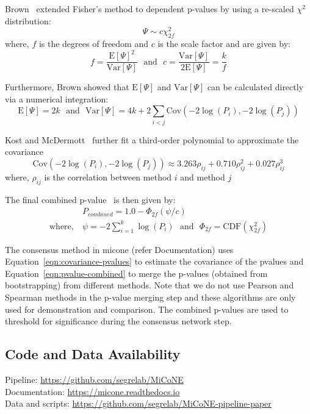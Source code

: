   Brown~\cite{brown_400_1975} extended Fisher's method to dependent p-values by using a re-scaled $\chi^2$ distribution:
  \begin{equation*}
    \Psi \sim c \chi^2_{2f}
  \end{equation*}
  where, $f$ is the degrees of freedom and $c$ is the scale factor and are given by:
  \begin{equation*}
    f = \frac{\mathrm{E}[\Psi]^2}{\mathrm{Var}[\Psi]} ~~~\text{and}~~~ c = \frac{\mathrm{Var}[\Psi]}{2\mathrm{E}[\Psi]} = \frac{k}{f}
  \end{equation*}

  Furthermore, Brown showed that $\mathrm{E}[\Psi]$ and $\mathrm{Var}[\Psi]$ can be calculated directly via a numerical integration:
  \begin{equation*}
    \mathrm{E}[\Psi] = 2k ~~~\text{and}~~~ \mathrm{Var}[\Psi] = 4k + 2\sum_{i<j} \mathrm{Cov}\left( -2\log(P_i), -2\log(P_j) \right)
  \end{equation*}

  Kost and McDermott~\cite{kost_combining_2002} further fit a third-order polynomial to approximate the covariance
  \begin{equation}
    \mathrm{Cov}\left( -2\log(P_i), -2\log(P_j) \right) \approx 3.263 \rho_{ij} + 0.710 \rho_{ij}^2 + 0.027 \rho_{ij}^3
    \label{eqn:covariance-pvalues}
  \end{equation}
  where, $\rho_{ij}$ is the correlation between method $i$ and method $j$

  The final combined p-value~\cite{Poole_Gibbs_Shmulevich_Bernard_Knijnenburg_2016} is then given by:
  \begin{equation}
    \begin{aligned}
        & P_{combined} = 1.0 - \Phi_{2f}\left( \psi / c \right) \\
        \text{where},~ &\psi = -2 \sum_{i=1}^k \log(P_i) ~~~\text{and}~~~ \Phi_{2f} = \mathrm{CDF}\left( \chi^2_{2f} \right)
    \end{aligned}
    \label{eqn:pvalue-combined}
  \end{equation}

  The consensus method in \ac{micone} (refer Documentation) uses Equation~\ref{eqn:covariance-pvalues} to estimate the covariance of the pvalues and Equation~\ref{eqn:pvalue-combined} to merge the p-values (obtained from bootstrapping) from different methods.
  Note that we do not use Pearson and Spearman methods in the p-value merging step and these algorithms are only used for demonstration and comparison.
  The combined p-values are used to threshold for significance during the consensus network step.

  \subsection*{Code and Data Availability}
  Pipeline: \href{https://github.com/segrelab/MiCoNE}{https://github.com/segrelab/MiCoNE} \\
  Documentation: \href{https://micone.readthedocs.io}{https://micone.readthedocs.io} \\
  Data and scripts: \href{https://github.com/segrelab/MiCoNE-pipeline-paper}{https://github.com/segrelab/MiCoNE-pipeline-paper}
